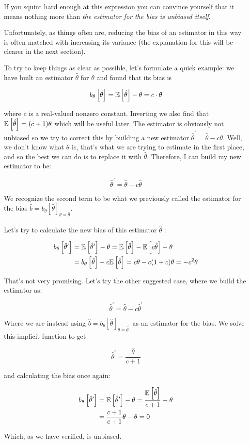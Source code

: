 If you squint hard enough at this expression you can convince yourself that it means nothing more than \emph{the estimator for the bias is unbiased itself}.

Unfortunately, as things often are, reducing the bias of an estimator in this way is often matched with increasing its variance (the explanation for this will be clearer in the next section).

\begin{example}
	To try to keep things as clear as possible, let's formulate a quick example: we have built an estimator $\hat\theta$ for $\theta$ and found that its bias is
	
	\[
	b_\theta \left[ \hat\theta \right] = \mathbb{E}\left[\hat\theta\right] - \theta = c \cdot \theta
	\]
	
	where $c$ is a real-valued nonzero constant. Inverting we also find that $\mathbb{E}\left[\hat\theta\right] = (c+1)\theta$ which will be useful later.
	The estimator is obviously not unbiased so we try to correct this by building a new estimator $\hat\theta^\prime = \hat\theta - c\theta$. Well, we don't know what $\theta$ is, that's what we are trying to estimate in the first place, and so the best we can do is to replace it with $\hat\theta$. Therefore, I can build my new estimator to be:
	
	\[
	\hat\theta^\prime = \hat\theta - c\hat\theta
	\]
	
	We recognize the second term to be what we previously called the estimator for the bias $\hat{b} = b_\theta\left[\hat\theta\right]_{\theta=\hat\theta}$. 
	
	Let's try to calculate the new bias of this estimator $\hat\theta^\prime$:
	
	\begin{align*}
	b_\theta\left[\hat\theta^\prime\right] &= \mathbb{E}\left[\hat\theta^\prime\right] - \theta = \mathbb{E}\left[\hat\theta\right] - \mathbb{E}\left[c\hat\theta\right] - \theta \\
	&= b_\theta\left[\hat\theta\right] - c\mathbb{E}\left[\hat\theta\right] = c\theta - c(1+c)\theta = -c^2\theta
	\end{align*}
	
	That's not very promising. Let's try the other suggested case, where we build the estimator as:
	
	\[
	\hat\theta^\prime = \hat\theta - c\hat\theta^\prime
	\]
	
	Where we are instead using $\hat{b} = b_\theta\left[\hat\theta\right]_{\theta=\hat\theta^\prime}$ as an estimator for the bias. We solve this implicit function to get
	
	\[
	\hat\theta^\prime = \frac{\hat\theta}{c+1}
	\]
	
	and calculating the bias once again:
	
	\begin{align*}
	b_\theta\left[\hat\theta^\prime\right] &= \mathbb{E}\left[\hat\theta^\prime\right] - \theta = \frac{\mathbb{E}\left[\hat\theta\right]}{c+1} - \theta \\
	&= \frac{c+1}{c+1}\theta - \theta = 0
	\end{align*}
	
	Which, as we have verified, is unbiased.
\end{example}
